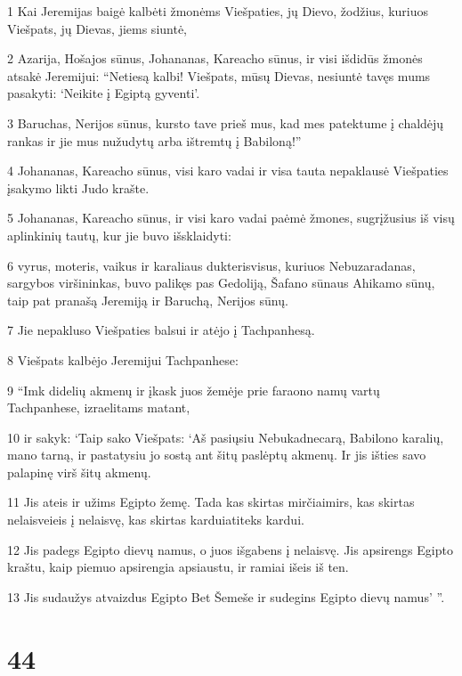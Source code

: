 \par 1 Kai Jeremijas baigė kalbėti žmonėms Viešpaties, jų Dievo, žodžius, kuriuos Viešpats, jų Dievas, jiems siuntė, 
\par 2 Azarija, Hošajos sūnus, Johananas, Kareacho sūnus, ir visi išdidūs žmonės atsakė Jeremijui: “Netiesą kalbi! Viešpats, mūsų Dievas, nesiuntė tavęs mums pasakyti: ‘Neikite į Egiptą gyventi’. 
\par 3 Baruchas, Nerijos sūnus, kursto tave prieš mus, kad mes patektume į chaldėjų rankas ir jie mus nužudytų arba ištremtų į Babiloną!” 
\par 4 Johananas, Kareacho sūnus, visi karo vadai ir visa tauta nepaklausė Viešpaties įsakymo likti Judo krašte. 
\par 5 Johananas, Kareacho sūnus, ir visi karo vadai paėmė žmones, sugrįžusius iš visų aplinkinių tautų, kur jie buvo išsklaidyti: 
\par 6 vyrus, moteris, vaikus ir karaliaus dukteris­visus, kuriuos Nebuzaradanas, sargybos viršininkas, buvo palikęs pas Gedoliją, Šafano sūnaus Ahikamo sūnų, taip pat pranašą Jeremiją ir Baruchą, Nerijos sūnų. 
\par 7 Jie nepakluso Viešpaties balsui ir atėjo į Tachpanhesą. 
\par 8 Viešpats kalbėjo Jeremijui Tachpanhese: 
\par 9 “Imk didelių akmenų ir įkask juos žemėje prie faraono namų vartų Tachpanhese, izraelitams matant, 
\par 10 ir sakyk: ‘Taip sako Viešpats: ‘Aš pasiųsiu Nebukadnecarą, Babilono karalių, mano tarną, ir pastatysiu jo sostą ant šitų paslėptų akmenų. Ir jis išties savo palapinę virš šitų akmenų. 
\par 11 Jis ateis ir užims Egipto žemę. Tada kas skirtas mirčiai­mirs, kas skirtas nelaisvei­eis į nelaisvę, kas skirtas kardui­atiteks kardui. 
\par 12 Jis padegs Egipto dievų namus, o juos išgabens į nelaisvę. Jis apsirengs Egipto kraštu, kaip piemuo apsirengia apsiaustu, ir ramiai išeis iš ten. 
\par 13 Jis sudaužys atvaizdus Egipto Bet Šemeše ir sudegins Egipto dievų namus’ ”.



\chapter{44}


